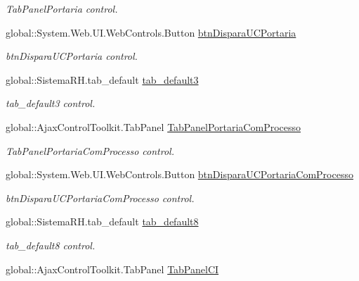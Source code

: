\begin{DoxyCompactItemize}
\begin{DoxyCompactList}\small\item\em TabPanelPortaria control. \item\end{DoxyCompactList}\item 
global::System.Web.UI.WebControls.Button \hyperlink{class_sistema_r_h_1_1_alterar_colaborador_ab67cd95a0a188f10c3767b9169433916}{btnDisparaUCPortaria}
\begin{DoxyCompactList}\small\item\em btnDisparaUCPortaria control. \item\end{DoxyCompactList}\item 
global::SistemaRH.tab\_\-default \hyperlink{class_sistema_r_h_1_1_alterar_colaborador_ae04046dd6eb4ff656b26551270979069}{tab\_\-default3}
\begin{DoxyCompactList}\small\item\em tab\_\-default3 control. \item\end{DoxyCompactList}\item 
global::AjaxControlToolkit.TabPanel \hyperlink{class_sistema_r_h_1_1_alterar_colaborador_ab1aaaddea57b01c1fb5ed804fb7d1dd4}{TabPanelPortariaComProcesso}
\begin{DoxyCompactList}\small\item\em TabPanelPortariaComProcesso control. \item\end{DoxyCompactList}\item 
global::System.Web.UI.WebControls.Button \hyperlink{class_sistema_r_h_1_1_alterar_colaborador_a1f1da5f84992c8b10fdb6c0495dcd159}{btnDisparaUCPortariaComProcesso}
\begin{DoxyCompactList}\small\item\em btnDisparaUCPortariaComProcesso control. \item\end{DoxyCompactList}\item 
global::SistemaRH.tab\_\-default \hyperlink{class_sistema_r_h_1_1_alterar_colaborador_a1947e68420d9edf6af8992501242be2a}{tab\_\-default8}
\begin{DoxyCompactList}\small\item\em tab\_\-default8 control. \item\end{DoxyCompactList}\item 
global::AjaxControlToolkit.TabPanel \hyperlink{class_sistema_r_h_1_1_alterar_colaborador_a77e05ab4139ee48a66b390e75c34a566}{TabPanelCI}

\end{DoxyCompactItemize}
